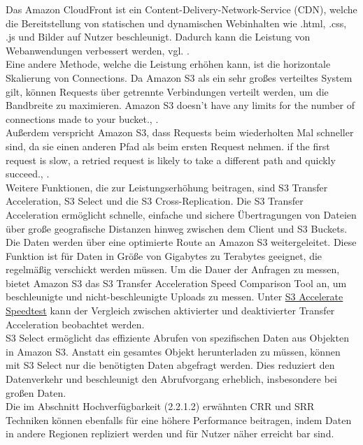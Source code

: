 Das Amazon CloudFront ist ein Content-Delivery-Network-Service (CDN), welche die Bereitstellung von statischen und dynamischen Webinhalten wie .html, .css, .js und Bilder auf Nutzer beschleunigt. Dadurch kann die Leistung von Webanwendungen verbessert werden, vgl. \cite{aws-cdn}.\\

Eine andere Methode, welche die Leistung erhöhen kann, ist die horizontale Skalierung von Connections. Da Amazon S3 als ein sehr großes verteiltes System gilt, können Requests über getrennte Verbindungen verteilt werden, um die Bandbreite zu maximieren. \glqq Amazon S3 doesn't have any limits for the number of connections made to your bucket.\grqq, \cite{performance-guide}.\\

Außerdem verspricht Amazon S3, dass Requests beim wiederholten Mal schneller sind, da sie einen anderen Pfad als beim ersten Request nehmen. \glqq[...] if the first request is slow, a retried request is likely to take a different path and quickly succeed.\grqq, \cite{performance-guide}.\\

Weitere Funktionen, die zur Leistungserhöhung beitragen, sind S3 Transfer Acceleration, S3 Select und die S3 Cross-Replication. Die S3 Transfer Acceleration ermöglicht schnelle, einfache und sichere Übertragungen von Dateien über große geografische Distanzen hinweg zwischen dem Client und S3 Buckets. Die Daten werden über eine optimierte Route an Amazon S3 weitergeleitet. Diese Funktion ist für Daten in Größe von Gigabytes zu Terabytes geeignet, die regelmäßig verschickt werden müssen. Um die Dauer der Anfragen zu messen, bietet Amazon S3 das S3 Transfer Acceleration Speed Comparison Tool an, um beschleunigte und nicht-beschleunigte Uploads zu messen. Unter \href{https://s3-accelerate-speedtest.s3-accelerate.amazonaws.com/en/accelerate-speed-comparsion.html}{S3 Accelerate Speedtest} kann der Vergleich zwischen aktivierter und deaktivierter Transfer Acceleration beobachtet werden.\\

S3 Select ermöglicht das effiziente Abrufen von spezifischen Daten aus Objekten in Amazon S3. Anstatt ein gesamtes Objekt herunterladen zu müssen, können mit S3 Select nur die benötigten Daten abgefragt werden. Dies reduziert den Datenverkehr und beschleunigt den Abrufvorgang erheblich, insbesondere bei großen Daten.\\

Die im Abschnitt Hochverfügbarkeit (2.2.1.2) erwähnten CRR und SRR Techniken können ebenfalls für eine höhere Performance beitragen, indem Daten in andere Regionen repliziert werden und für Nutzer näher erreicht bar sind.\\

